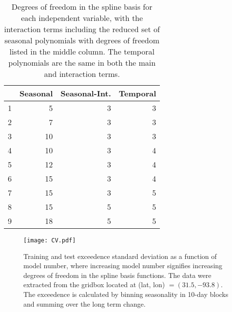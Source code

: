 \documentclass{ametsoc}
\newcommand\smallfigwidth{\columnwidth}
\begin{document}
\begin{table}[ht]
\centering
\begin{tabular}{rrrr}
  \hline
 & Seasonal & Seasonal-Int. & Temporal \\ 
  \hline
1 & 5 & 3 & 3 \\ 
  2 & 7 & 3 & 3 \\ 
  3 & 10 & 3 & 3 \\ 
  4 & 10 & 3 & 4 \\ 
  5 & 12 & 3 & 4 \\ 
  6 & 15 & 3 & 4 \\ 
  7 & 15 & 3 & 5 \\ 
  8 & 15 & 5 & 5 \\ 
  9 & 18 & 5 & 5 \\ 
   \hline
\end{tabular}
\caption{Degrees of freedom in the spline basis for each 
    independent variable, with the interaction terms including the reduced set of seasonal polynomials with degrees of freedom listed in the middle column. The temporal polynomials are the same in both the main and interaction terms.} 
\label{tab:models}
\end{table}

\begin{figure}[ht]
\centerline{\texttt{[image: CV.pdf]}}
\caption{\small{Training and test exceedence standard deviation as a function of model number, where increasing model number signifies increasing degrees of freedom in the spline basis functions. The data were extracted from the gridbox located at (lat, lon) $=(31.5, -93.8)$}. The exceedence is calculated by binning seasonality in 10-day blocks and summing over the long term change.}
\label{CV}
\end{figure}
\end{document}
